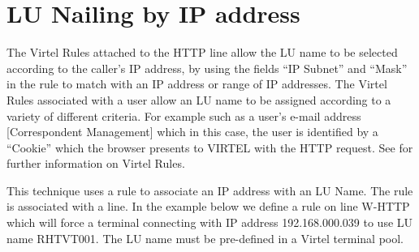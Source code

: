 \documentclass[letterpaper,10pt,english]{sphinxmanual}
\begin{document}
\newpage


\section{LU Nailing by IP address}
\label{\detokenize{connectivity_guide:index-154}}\label{\detokenize{connectivity_guide:lu-nailing-by-ip-address}}
The Virtel Rules attached to the HTTP line allow the LU name to be selected according to the caller’s IP address, by using the fields “IP Subnet” and “Mask” in the rule to match with an IP address or range of IP addresses. The Virtel Rules associated with a user allow an LU name to be assigned according to a variety of different criteria. For example such as a user’s e-mail address {[}Correspondent Management{]} which in this case, the user is identified by a “Cookie” which the browser presents to VIRTEL with the HTTP request. See {\hyperref[\detokenize{connectivity_guide:v457cn-virtelrules}]{}} for further information on Virtel Rules.

This technique uses a rule to associate an IP address with an LU Name. The rule is associated with a line. In the example below we define a rule on line W-HTTP which will force a terminal connecting with IP address 192.168.000.039 to use LU name RHTVT001. The LU name must be pre-defined in a Virtel terminal pool.
\end{document}
